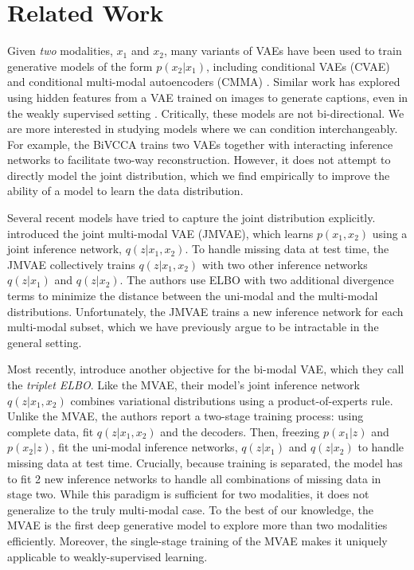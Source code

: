 \section{Related Work}
\label{sec:related_work}

Given \textit{two} modalities, $x_{1}$ and $x_{2}$, many variants of VAEs \cite{kingma2013auto, kingma2014semi}  have been used to train generative models of the form $p(x_{2} | x_{1})$, including conditional VAEs (CVAE) \cite{sohn2015learning} and conditional multi-modal autoencoders (CMMA) \cite{pandey2017variational}. Similar work has explored using hidden features from a VAE trained on images to generate captions, even in the weakly supervised setting \cite{pu2016variational}. Critically, these models are not bi-directional. We are more interested in studying models where we can condition interchangeably. For example, the BiVCCA \cite{wang2016deep} trains two VAEs together with interacting inference networks to facilitate two-way reconstruction. However, it does not attempt to directly model the joint distribution, which we find empirically to improve the ability of a model to learn the data distribution.

Several recent models have tried to capture the joint distribution explicitly. \cite{suzuki2016joint} introduced the joint multi-modal VAE (JMVAE), which learns $p(x_{1}, x_{2})$ using a joint inference network, $q(z|x_{1}, x_{2})$. To handle missing data at test time, the JMVAE collectively trains $q(z|x_{1}, x_{2})$ with two other inference networks $q(z|x_{1})$ and $q(z|x_{2})$. The authors use ELBO with two additional divergence terms to minimize the distance between the uni-modal and the multi-modal distributions. Unfortunately, the JMVAE trains a new inference network for each multi-modal subset, which we have previously argue to be intractable in the general setting.

Most recently, \cite{vedantam2017generative} introduce another objective for the bi-modal VAE, which they call the \textit{triplet ELBO}. Like the MVAE, their model's joint inference network $q(z|x_{1}, x_{2})$ combines variational distributions using a product-of-experts rule. Unlike the MVAE, the authors report a two-stage training process: using complete data, fit $q(z|x_{1}, x_{2})$ and the decoders. Then, freezing $p(x_{1}|z)$ and $p(x_{2}|z)$, fit the uni-modal inference networks, $q(z|x_{1})$ and $q(z|x_{2})$ to handle missing data at test time. Crucially, because training is separated, the model has to fit 2 new inference networks to handle all combinations of missing data in stage two. While this paradigm is sufficient for two modalities, it does not generalize to the truly multi-modal case. To the best of our knowledge, the MVAE is the first deep generative model to explore more than two modalities efficiently. Moreover, the single-stage training of the MVAE makes it uniquely applicable to weakly-supervised learning.

